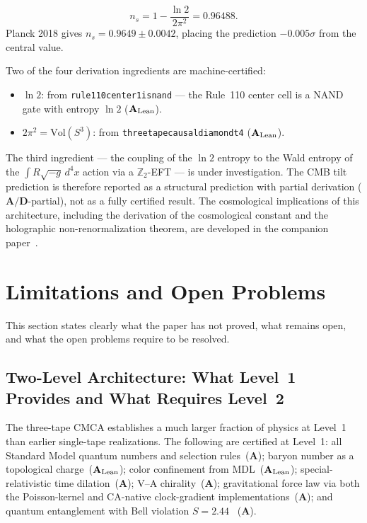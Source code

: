 \documentclass[11pt]{article}
\theoremstyle{remark}
\newcommand{\ZZ}{\mathbb{Z}}
\newcommand{\lean}[1]{%
  \penalty-100
  \begingroup\def\_{\textunderscore\allowbreak}\texttt{#1}\endgroup}
\newcommand{\CatA}{\textbf{A}}
\newcommand{\CatAL}{\ensuremath{\textbf{A}_{\rm Lean}}}
\newcommand{\CatAD}{\textbf{A/D}}
\newcommand{\CMCA}{\text{CMCA}}
\begin{document}
\begin{equation}
  n_s = 1 - \frac{\ln 2}{2\pi^2} = 0.96488.
  \label{eq:ns}
\end{equation}
Planck 2018 gives $n_s = 0.9649 \pm 0.0042$, placing the prediction
$-0.005\sigma$ from the central value.

Two of the four derivation ingredients are machine-certified:
\begin{itemize}
  \item $\ln 2$: from \lean{rule110\_center1\_is\_nand} — the Rule~110
        center cell is a NAND gate with entropy $\ln 2$ ($\CatAL$).
  \item $2\pi^2 = \mathrm{Vol}(S^3)$: from
        \lean{three\_tape\_causal\_diamond\_t4} ($\CatAL$).
\end{itemize}
The third ingredient — the coupling of the $\ln 2$ entropy to the
Wald entropy of the $\int R\sqrt{-g}\,d^4x$ action via a $\ZZ_2$-EFT — is
under investigation. The CMB tilt prediction is therefore reported as a
structural prediction with partial derivation ($\CatAD$-partial), not as a
fully certified result.
The cosmological implications of this architecture, including the derivation of the cosmological constant and the holographic non-renormalization theorem, are developed in the companion paper~\cite{SpivackGTECosmology}.

\FloatBarrier

\section{Limitations and Open Problems}
\label{sec:limitations}

This section states clearly what the paper has not proved, what remains
open, and what the open problems require to be resolved.

\subsection{Two-Level Architecture: What Level~1 Provides and What Requires Level~2}
\label{sec:twolevel}

The three-tape $\CMCA$ establishes a much larger fraction of physics at Level~1
than earlier single-tape realizations. The following are certified at Level~1:
all Standard Model quantum numbers and selection rules~($\CatA$); baryon number as a
topological charge~($\CatAL$); color confinement from MDL~($\CatAL$);
special-relativistic time dilation~($\CatA$); V--A chirality~($\CatA$);
gravitational force law via both the Poisson-kernel and CA-native clock-gradient
implementations~($\CatA$); and quantum entanglement with Bell violation $S=2.44$
~($\CatA$).
\end{document}
